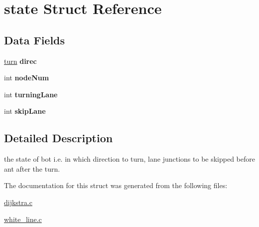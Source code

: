\hypertarget{structstate}{
\section{state Struct Reference}
\label{structstate}
}
\subsection*{Data Fields}
\begin{DoxyCompactItemize}
\item 
\hypertarget{structstate_a7c9d0a55a26b17efc948a3164ef83a39}{
\hyperlink{dijkstra_8c_a27e2cc779821c6d574530ff9a527373c}{turn} {\bfseries direc}}
\label{structstate_a7c9d0a55a26b17efc948a3164ef83a39}

\item 
\hypertarget{structstate_a787bebfa4c764244b11726a4024576a4}{
int {\bfseries nodeNum}}
\label{structstate_a787bebfa4c764244b11726a4024576a4}

\item 
\hypertarget{structstate_af4f40d5934d20860abaa7d9e08434b7d}{
int {\bfseries turningLane}}
\label{structstate_af4f40d5934d20860abaa7d9e08434b7d}

\item 
\hypertarget{structstate_a0eabc5ce3275b2d0d1089a7182e1fc5f}{
int {\bfseries skipLane}}
\label{structstate_a0eabc5ce3275b2d0d1089a7182e1fc5f}

\end{DoxyCompactItemize}


\subsection{Detailed Description}
the state of bot i.e. in which direction to turn, lane junctions to be skipped before ant after the turn. 

The documentation for this struct was generated from the following files:\begin{DoxyCompactItemize}
\item 
\hyperlink{dijkstra_8c}{dijkstra.c}\item 
\hyperlink{white__line_8c}{white\_\-line.c}\end{DoxyCompactItemize}
